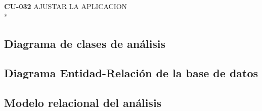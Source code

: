 \documentclass[../pfc.tex]{subfiles}
\begin{document}
	

	
	\textbf{CU-032}	AJUSTAR LA APLICACION\\*
	

	



























		
	\subsection{Diagrama de clases de análisis}
		
	\subsection{Diagrama Entidad-Relación de la base de datos}
		
	\subsection{Modelo relacional del análisis}
	
\end{document}
